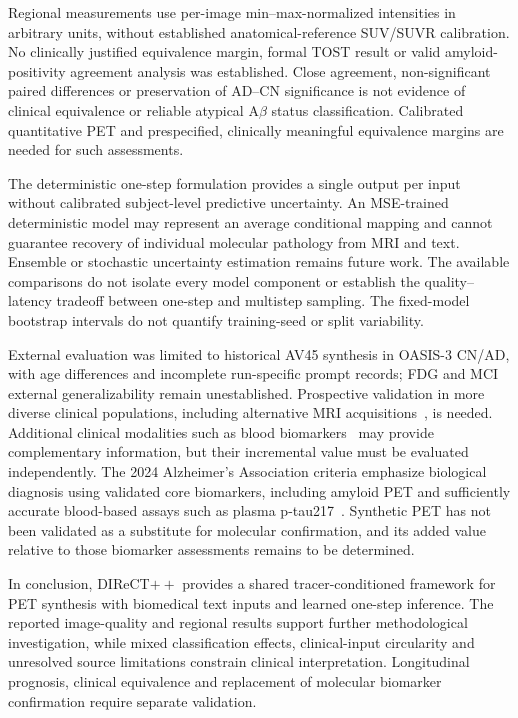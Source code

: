 \documentclass{article}
\begin{document}
Regional measurements use per-image min--max-normalized intensities in arbitrary units, without established anatomical-reference SUV/SUVR calibration. No clinically justified equivalence margin, formal TOST result or valid amyloid-positivity agreement analysis was established. Close agreement, non-significant paired differences or preservation of AD--CN significance is not evidence of clinical equivalence or reliable atypical A$\beta$ status classification. Calibrated quantitative PET and prespecified, clinically meaningful equivalence margins are needed for such assessments.

The deterministic one-step formulation provides a single output per input without calibrated subject-level predictive uncertainty. An MSE-trained deterministic model may represent an average conditional mapping and cannot guarantee recovery of individual molecular pathology from MRI and text. Ensemble or stochastic uncertainty estimation remains future work. The available comparisons do not isolate every model component or establish the quality--latency tradeoff between one-step and multistep sampling. The fixed-model bootstrap intervals do not quantify training-seed or split variability.

External evaluation was limited to historical AV45 synthesis in OASIS-3 CN/AD, with age differences and incomplete run-specific prompt records; FDG and MCI external generalizability remain unestablished. Prospective validation in more diverse clinical populations, including alternative MRI acquisitions~\cite{sorby2024portable}, is needed. Additional clinical modalities such as blood biomarkers~\cite{hansson2023blood} may provide complementary information, but their incremental value must be evaluated independently. The 2024 Alzheimer's Association criteria emphasize biological diagnosis using validated core biomarkers, including amyloid PET and sufficiently accurate blood-based assays such as plasma p-tau217~\cite{jack2024revised}. Synthetic PET has not been validated as a substitute for molecular confirmation, and its added value relative to those biomarker assessments remains to be determined.

In conclusion, DIReCT$++$ provides a shared tracer-conditioned framework for PET synthesis with biomedical text inputs and learned one-step inference. The reported image-quality and regional results support further methodological investigation, while mixed classification effects, clinical-input circularity and unresolved source limitations constrain clinical interpretation. Longitudinal prognosis, clinical equivalence and replacement of molecular biomarker confirmation require separate validation.
\end{document}
